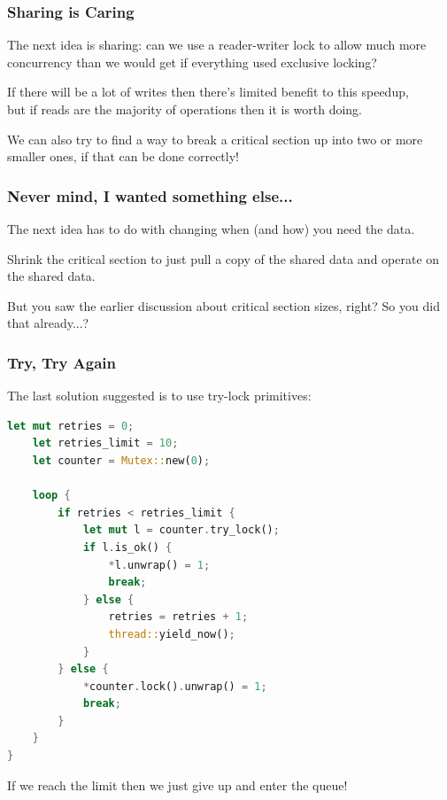 \begin{frame}
\frametitle{Sharing is Caring}

The next idea is sharing: can we use a reader-writer lock to allow much more concurrency than we would get if everything used exclusive locking? 

If there will be a lot of writes then there's limited benefit to this speedup, \\
\hspace*{2em} but if reads are the majority of operations then it is worth doing. 

We can also try to find a way to break a critical section up into two or more smaller ones, if that can be done correctly!

\end{frame}

\begin{frame}
\frametitle{Never mind, I wanted something else...}

The next idea has to do with changing when (and how) you need the data. 

Shrink the critical section to just pull a copy of the shared data and operate on the shared data. 
 
 
But you saw the earlier discussion about critical section sizes, right? So you did that already...?


\end{frame} 


\begin{frame}[fragile]
\frametitle{Try, Try Again}

The last solution suggested is to use try-lock primitives:

\begin{lstlisting}[language=Rust]
    let mut retries = 0;
    let retries_limit = 10;
    let counter = Mutex::new(0);

    loop {
        if retries < retries_limit {
            let mut l = counter.try_lock();
            if l.is_ok() {
                *l.unwrap() = 1;
                break;
            } else {
                retries = retries + 1;
                thread::yield_now();
            }
        } else {
            *counter.lock().unwrap() = 1;
            break;
        }
    }
}
\end{lstlisting}


If we reach the limit then we just give up and enter the queue!

\end{frame}



